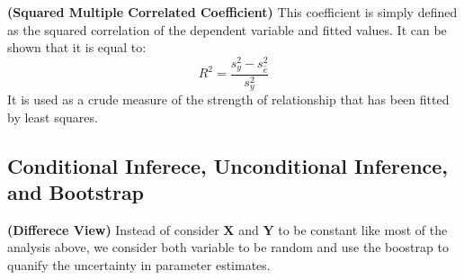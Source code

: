 \begin{definition}{\textbf{(Squared Multiple Correlated Coefficient)}}
    This coefficient is simply defined as the squared correlation of the dependent variable and fitted values. It can be shown that it is equal to:
    \begin{equation*}
        R^2 = \frac{s_y^2 - s^2_{\hat{e}}}{s^2_y}
    \end{equation*}
    It is used as a crude measure of the strength of relationship that has been fitted by least squares. 
\end{definition}

\subsection{Conditional Inferece, Unconditional Inference, and Bootstrap}

\begin{remark}{\textbf{(Differece View)}}
    Instead of consider $\boldsymbol X$ and $\boldsymbol Y$ to be constant like most of the analysis above, we consider both variable to be random and use the boostrap to quanify the uncertainty in parameter estimates. 
\end{remark}

